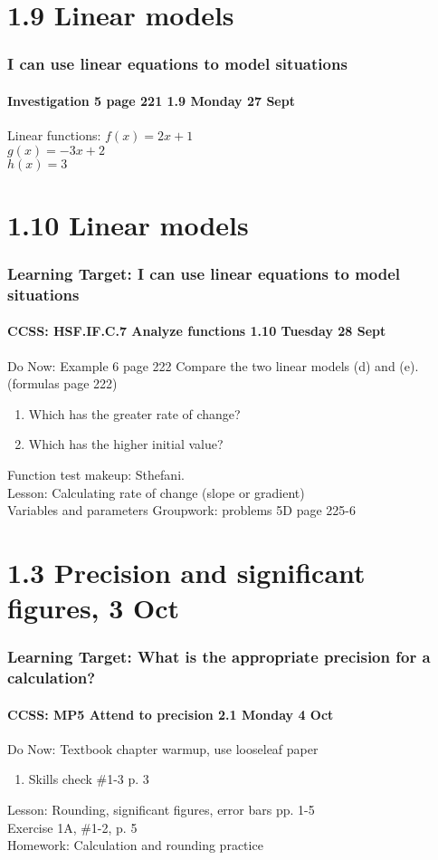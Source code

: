\documentclass{beamer}
\begin{document}
  \section{1.9 Linear models}
  \frame
  {
    \frametitle{I can use linear equations to model situations}
    \framesubtitle{Investigation 5 page 221 \hfill \alert{1.9 Monday 27 Sept}}

    \begin{block}{Linear functions:}\vspace{0.5cm}
       $f(x)=2x+1$\\[1cm]
       $g(x)=-3x+2$\\[1cm]
       $h(x)=3$
    \end{block}\vspace{1.5cm}
  }

  \section{1.10 Linear models}
  \frame
  {
    \frametitle{Learning Target: I can use linear equations to model situations}
    \framesubtitle{CCSS: HSF.IF.C.7 Analyze functions \hfill \alert{1.10 Tuesday 28 Sept}}

    \begin{block}{Do Now: Example 6 page 222}
        Compare the two linear models (d) and (e). (formulas page 222)
        \begin{enumerate}
          \item Which has the greater rate of change?
          \item Which has the higher initial value?
        \end{enumerate}
    \end{block}\vspace{0.5cm}
    Function test makeup: Sthefani.\\[0.5cm]
    Lesson: Calculating rate of change (slope or gradient)\\[0.25cm]
    Variables and parameters
    Groupwork: problems 5D page 225-6
  }



  \section{1.3 Precision and significant figures, 3 Oct}
  \frame
  {
    \frametitle{Learning Target: What is the appropriate precision for a calculation?}
    \framesubtitle{CCSS: MP5 Attend to precision \hfill \alert{2.1 Monday 4 Oct}}

    \begin{block}{Do Now: Textbook chapter warmup, use looseleaf paper}
    \begin{enumerate}
        \item Skills check \#1-3 p. 3
    \end{enumerate}
    \end{block}
    Lesson: Rounding, significant figures, error bars pp. 1-5\\
    Exercise 1A, \#1-2, p. 5
    \\[0.5cm]
    Homework: Calculation and rounding practice
  }
\end{document}

